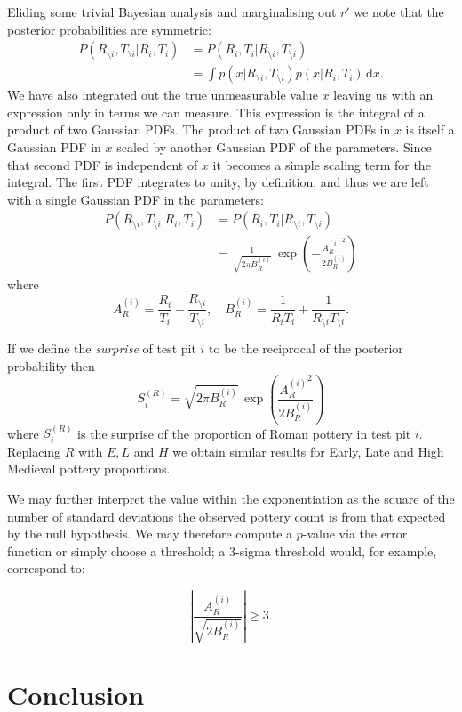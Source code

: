 \documentclass[conference]{IEEEtran}
\begin{document}
Eliding some trivial Bayesian analysis and marginalising out $r'$ we note that
the posterior probabilities are symmetric:
\begin{align*}
    P(R_{\setminus i},T_{\setminus i} | R_i, T_i) &= P(R_i, T_i | R_{\setminus
    i},T_{\setminus i}) \\
    & = \int p(x | R_{\setminus i}, T_{\setminus i}) p(x | R_i, T_i) \, \mathrm{d}x.
\end{align*}
We have also integrated out the true unmeasurable value $x$ leaving us with an
expression only in terms we can measure.  This expression is the integral of a
product of two Gaussian PDFs.  The product of two Gaussian PDFs in $x$ is itself
a Gaussian PDF in $x$ scaled by another Gaussian PDF of the parameters. Since
that second PDF is independent of $x$ it becomes a simple scaling term for the
integral. The first PDF integrates to unity, by definition, and thus we are left
with a single Gaussian PDF in the parameters:
\begin{align*}
    P(R_{\setminus i},T_{\setminus i} | R_i, T_i) &= P(R_i, T_i | R_{\setminus
    i},T_{\setminus i}) \\ &=
    \frac{1}{\sqrt{2 \pi B^{(i)}_R}} \, \exp \left(
    - \frac{{A^{(i)}_R}^2}{2 B^{(i)}_R}
    \right)
\end{align*}
where
\[
    A^{(i)}_R = \frac{R_i}{T_i} - \frac{R_{\setminus i}}{T_{\setminus i}}, \quad
    B^{(i)}_R = \frac{1}{R_i T_i} + \frac{1}{R_{\setminus i} T_{\setminus i}}.
\]

If we define the \emph{surprise} of test pit $i$ to be the reciprocal of the
posterior probability then
\[
    S^{(R)}_i = \sqrt{2\pi B^{(i)}_R} \, \exp \left( \frac{{A^{(i)}_R}^2}{2B^{(i)}_R} \right)
\]
where $S^{(R)}_i$ is the surprise of the proportion of Roman pottery in test pit
$i$. Replacing $R$ with $E, L$ and $H$ we obtain similar results for Early, Late
and High Medieval pottery proportions.

We may further interpret the value within the exponentiation as the square of
the number of standard deviations the observed pottery count is from that
expected by the null hypothesis. We may therefore compute a $p$-value via the
error function or simply choose a threshold; a 3-sigma threshold would, for
example, correspond to:

\[
    \left|\frac{A^{(i)}_R}{\sqrt{2 B^{(i)}_R}}\right| \ge 3.
\]

\section{Conclusion}
\end{document}
